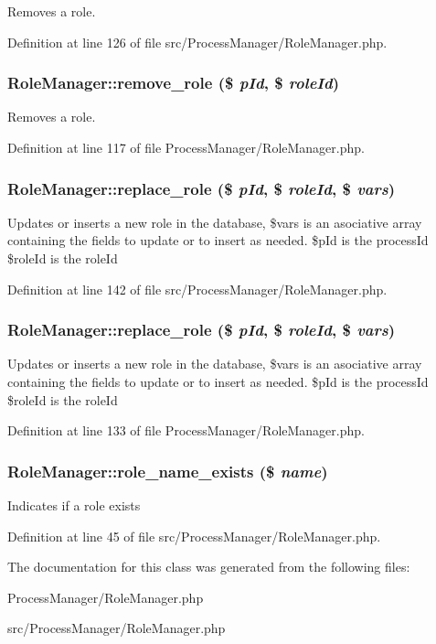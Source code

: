 Removes a role. 

Definition at line 126 of file src/Process\-Manager/Role\-Manager.php.
\subsubsection{\setlength{\rightskip}{0pt plus 5cm}Role\-Manager::remove\_\-role (\$ {\em p\-Id}, \$ {\em role\-Id})}\label{classRoleManager_a6}


Removes a role. 

Definition at line 117 of file Process\-Manager/Role\-Manager.php.
\subsubsection{\setlength{\rightskip}{0pt plus 5cm}Role\-Manager::replace\_\-role (\$ {\em p\-Id}, \$ {\em role\-Id}, \$ {\em vars})}\label{classRoleManager_a16}


Updates or inserts a new role in the database, \$vars is an asociative array containing the fields to update or to insert as needed. \$p\-Id is the process\-Id \$role\-Id is the role\-Id 

Definition at line 142 of file src/Process\-Manager/Role\-Manager.php.
\subsubsection{\setlength{\rightskip}{0pt plus 5cm}Role\-Manager::replace\_\-role (\$ {\em p\-Id}, \$ {\em role\-Id}, \$ {\em vars})}\label{classRoleManager_a7}


Updates or inserts a new role in the database, \$vars is an asociative array containing the fields to update or to insert as needed. \$p\-Id is the process\-Id \$role\-Id is the role\-Id 

Definition at line 133 of file Process\-Manager/Role\-Manager.php.
\subsubsection{\setlength{\rightskip}{0pt plus 5cm}Role\-Manager::role\_\-name\_\-exists (\$ {\em name})}\label{classRoleManager_a10}


Indicates if a role exists 

Definition at line 45 of file src/Process\-Manager/Role\-Manager.php.

The documentation for this class was generated from the following files:\begin{CompactItemize}
\item 
Process\-Manager/Role\-Manager.php\item 
src/Process\-Manager/Role\-Manager.php\end{CompactItemize}
